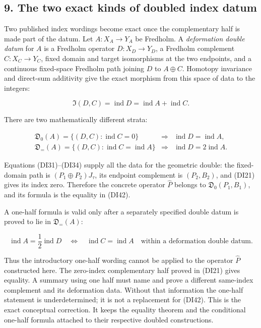 \documentclass[
  11pt,
]{article}
\begin{document}
\subsection{9. The two exact kinds of doubled index
datum}\label{the-two-exact-kinds-of-doubled-index-datum}

Two published index wordings become exact once the complementary half is
made part of the datum. Let \(A:X_A\to Y_A\) be Fredholm. A
\emph{deformation double datum} for \(A\) is a Fredholm operator
\(D:X_D\to Y_D\), a Fredholm complement \(C:X_C\to Y_C\), fixed domain
and target isomorphisms at the two endpoints, and a continuous
fixed-space Fredholm path joining \(D\) to \(A\oplus C\). Homotopy
invariance and direct-sum additivity give the exact morphism from this
space of data to the integers:

\[
 \mathfrak I(D,C)=\operatorname{ind}D
 =\operatorname{ind}A+\operatorname{ind}C.
 \tag{DI43}
\]

There are two mathematically different strata:

\[
 \begin{array}{lll}
 \mathfrak D_0(A)=\{(D,C):\operatorname{ind}C=0\}
 &\Longrightarrow&\operatorname{ind}D=\operatorname{ind}A,\\[1mm]
 \mathfrak D_{=}(A)=\{(D,C):\operatorname{ind}C=\operatorname{ind}A\}
 &\Longrightarrow&\operatorname{ind}D=2\operatorname{ind}A.
 \end{array}
 \tag{DI44}
\]

Equations (DI31)--(DI34) supply all the data for the geometric double:
the fixed-domain path is \((P_1\oplus P_2)J_\tau\), its endpoint
complement is \((P_2,B_2)\), and (DI21) gives its index zero. Therefore
the concrete operator \(\widehat P\) belongs to
\(\mathfrak D_0(P_1,B_1)\), and its formula is the equality in (DI42).

A one-half formula is valid only after a separately specified double
datum is proved to lie in \(\mathfrak D_{=}(A)\):

\[
 \operatorname{ind}A=\frac12\operatorname{ind}D
 \quad\Longleftrightarrow\quad
 \operatorname{ind}C=\operatorname{ind}A
 \quad\text{within a deformation double datum.}
 \tag{DI45}
\]

Thus the introductory one-half wording cannot be applied to the operator
\(\widehat P\) constructed here. The zero-index complementary half
proved in (DI21) gives equality. A summary using one half must name and
prove a different same-index complement and its deformation data.
Without that information the one-half statement is underdetermined; it
is not a replacement for (DI42). This is the exact conceptual
correction. It keeps the equality theorem and the conditional one-half
formula attached to their respective doubled constructions.
\end{document}
